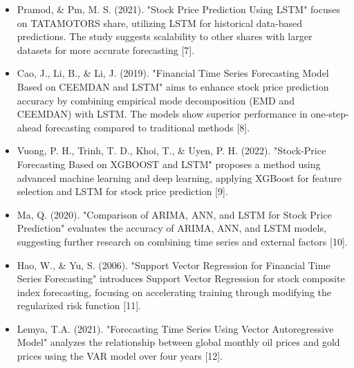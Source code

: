 \documentclass{ieeeojies}
\begin{document}
\begin{itemize}
    \item Pramod, \& Pm, M. S. (2021). "Stock Price Prediction Using LSTM" focuses on TATAMOTORS share, utilizing LSTM for historical data-based predictions. The study suggests scalability to other shares with larger datasets for more accurate forecasting [7].

\item Cao, J., Li, B., \& Li, J. (2019). "Financial Time Series Forecasting Model Based on CEEMDAN and LSTM" aims to enhance stock price prediction accuracy by combining empirical mode decomposition (EMD and CEEMDAN) with LSTM. The models show superior performance in one-step-ahead forecasting compared to traditional methods [8].

\item Vuong, P. H., Trinh, T. D., Khoi, T., \& Uyen, P. H. (2022). "Stock-Price Forecasting Based on XGBOOST and LSTM" proposes a method using advanced machine learning and deep learning, applying XGBoost for feature selection and LSTM for stock price prediction [9].

\item Ma, Q. (2020). "Comparison of ARIMA, ANN, and LSTM for Stock Price Prediction" evaluates the accuracy of ARIMA, ANN, and LSTM models, suggesting further research on combining time series and external factors [10].

\item Hao, W., \& Yu, S. (2006). "Support Vector Regression for Financial Time Series Forecasting" introduces Support Vector Regression for stock composite index forecasting, focusing on accelerating training through modifying the regularized risk function [11].

\item Lemya, T.A. (2021). "Forecasting Time Series Using Vector Autoregressive Model" analyzes the relationship between global monthly oil prices and gold prices using the VAR model over four years [12].
\end{itemize}
\end{document}
